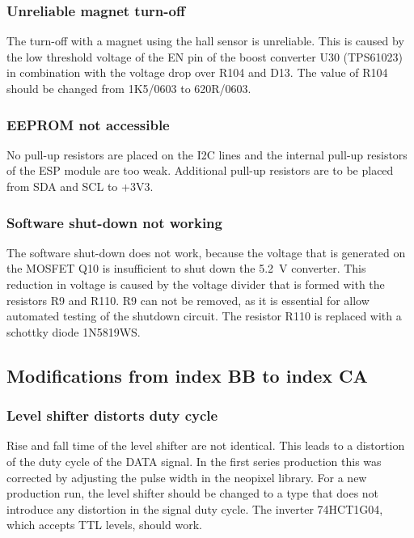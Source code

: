 \subsubsection{Unreliable magnet turn-off}
The turn-off with a magnet using the hall sensor is unreliable. This is caused by the low threshold voltage of the EN pin of the boost converter U30 (TPS61023) in combination with the voltage drop over R104 and D13. The value of R104 should be changed from 1K5/0603 to 620R/0603. 

\subsubsection{EEPROM not accessible}
No pull-up resistors are placed on the \ac{I2C} lines and the internal pull-up resistors of the ESP module are too weak. Additional pull-up resistors are to be placed from SDA and SCL to +3V3. 

\subsubsection{Software shut-down not working}
The software shut-down does not work, because the voltage that is generated on the \ac{MOSFET} Q10 is insufficient to shut down the \qty{5.2}{\volt} converter. This reduction in voltage is caused by the voltage divider that is formed with the resistors R9 and R110. R9 can not be removed, as it is essential for allow automated testing of the shutdown circuit. The resistor R110 is replaced with a schottky diode 1N5819WS. 

\subsection{Modifications from index BB to index CA}

\subsubsection{Level shifter distorts duty cycle}
Rise and fall time of the level shifter are not identical. This leads to a distortion of the duty cycle of the DATA signal. In the first series production this was corrected by adjusting the pulse width in the neopixel library. 
For a new production run, the level shifter should be changed to a type that does not introduce any distortion in the signal duty cycle. 
The inverter 74HCT1G04, which accepts TTL levels, should work. 

\FloatBarrier

